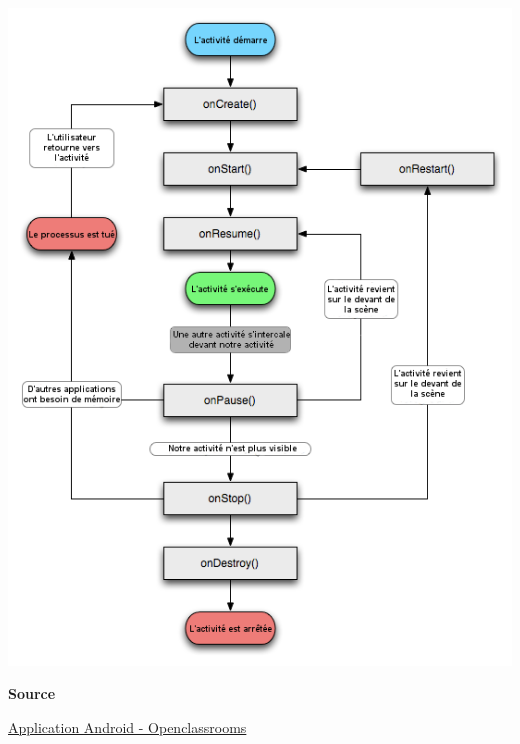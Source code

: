 \documentclass[francais,12pt]{article}
\begin{document}
		\begin{center}
			\includegraphics[width=0.9\linewidth]{images/cycleVie}
		\end{center}	
		
		\textbf{Source}
        
        \href{https://openclassrooms.com/courses/creez-des-applications-pour-android/preambule-quelques-concepts-avances}{Application Android - Openclassrooms}
        
\end{document}
